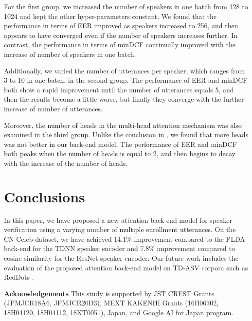 \documentclass[a4paper]{article}
\begin{document}
For the first group, we increased the number of speakers in one batch from 128 to 1024 and kept the other hyper-parameters constant. We found that the performance in terms of EER improved as speakers increased to 256, and then appears to have converged even if the number of speakers increases further. In contrast, the performance in terms of minDCF continually improved with the increase of number of speakers in one batch.

Additionally, we varied the number of utterances per speaker, which ranges from 3 to 10 in one batch, in the second group. The performance of EER and minDCF both show a rapid improvement until the number of utterances equals 5, and then the results become a little worse, but finally they converge with the further increase of number of utterances.

Moreover, the number of heads in the multi-head attention mechanism was also examined in the third group. Unlike the conclusion in \cite{Zhu2018-SelfAtt}, we found that more heads was not better in our back-end model. The performance of EER and minDCF both peaks when the number of heads is equal to 2, and then begins to decay with the increase of the number of heads. 

\section{Conclusions}
In this paper, we have proposed a new attention back-end model for speaker verification using a varying number of multiple enrollment utterances. 
On the CN-Celeb dataset, we have achieved 14.1\% improvement compared to the PLDA back-end for the TDNN speaker encoder and 7.8\% improvement compared to cosine similarity for the ResNet speaker encoder. Our future work includes the evaluation of the proposed attention back-end model on TD-ASV corpora such as RedDots \cite{RedDots}.




\noindent
\textbf{Acknowledgements}
\footnotesize{This study is supported by JST CREST Grants (JPMJCR18A6, JPMJCR20D3), MEXT KAKENHI Grants (16H06302, 18H04120, 18H04112, 18KT0051), Japan, and Google AI for Japan program. }





\end{document}
